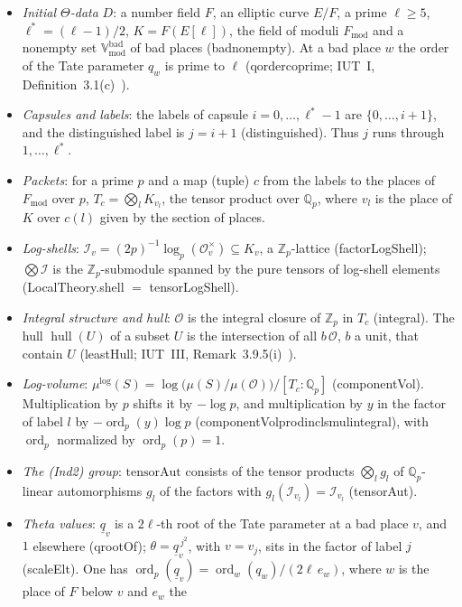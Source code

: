 \documentclass[11pt,a4paper]{article}
\newcommand{\Zp}{\mathbb{Z}_p}
\newcommand{\Qp}{\mathbb{Q}_p}
\newcommand{\I}{\mathcal{I}}
\newcommand{\Ocal}{\mathcal{O}}
\newcommand{\ordp}{\operatorname{ord}_p}
\newcommand{\hull}{\operatorname{hull}}
\newcommand{\mulog}{\mu^{\log}}
\newcommand{\Vbad}{\mathbb{V}_{\mathrm{mod}}^{\mathrm{bad}}}
\newcommand{\qb}{\underline{q}}
\newcommand{\leanus}{\textunderscore\allowbreak}
\newcommand{\lean}[1]{{\ttfamily\let\_\leanus #1}}
\theoremstyle{plain}
\theoremstyle{definition}
\theoremstyle{remark}
\begin{document}
\begin{itemize}
\item \emph{Initial $\Theta$-data} $D$: a number field $F$, an elliptic curve $E/F$, a prime $\ell\ge5$,
$\ell^*=(\ell-1)/2$, $K=F(E[\ell])$, the field of moduli $F_{\mathrm{mod}}$ and a nonempty set $\Vbad$ of bad places
(\lean{bad\_nonempty}). At a bad place $w$ the order of the Tate parameter $q_w$ is prime to $\ell$
(\lean{q\_order\_coprime}; IUT~I, Definition~3.1(c)~\cite{IUT1}).
\item \emph{Capsules and labels}: the labels of capsule $i=0,\dots,\ell^*-1$ are $\{0,\dots,i+1\}$, and the
distinguished label is $j=i+1$ (\lean{distinguished}). Thus $j$ runs through $1,\dots,\ell^*$.
\item \emph{Packets}: for a prime $p$ and a map (tuple) $c$ from the labels to the places of $F_{\mathrm{mod}}$ over $p$,
$T_c=\bigotimes_lK_{v_l}$, the tensor product over $\Qp$, where $v_l$ is the place of $K$ over $c(l)$ given by the
section of places.
\item \emph{Log-shells}: $\I_v=(2p)^{-1}\log_p(\Ocal_v^{\times})\subseteq K_v$, a $\Zp$-lattice
(\lean{factorLogShell}); $\bigotimes\I$ is the $\Zp$-submodule spanned by the pure tensors of log-shell elements
(\lean{LocalTheory.shell} $=$ \lean{tensorLogShell}).
\item \emph{Integral structure and hull}: $\Ocal$ is the integral closure of $\Zp$ in $T_c$ (\lean{integral}). The
hull $\hull(U)$ of a subset $U$ is the intersection of all $b\,\Ocal$, $b$ a unit, that contain $U$
(\lean{leastHull}; IUT~III, Remark~3.9.5(i)~\cite{IUT3}).
\item \emph{Log-volume}: $\mulog(S)=\log\bigl(\mu(S)/\mu(\Ocal)\bigr)/[T_c:\Qp]$ (\lean{componentVol}). Multiplication by
$p$ shifts it by $-\log p$, and multiplication by $y$ in the factor of label $l$ by $-\ordp(y)\log p$
(\lean{componentVol\_prod\_incl\_smul\_integral}), with $\ordp$ normalized by $\ordp(p)=1$.
\item \emph{The (Ind2) group}: $\mathrm{tensorAut}$ consists of the tensor products $\bigotimes_lg_l$ of
$\Qp$-linear automorphisms $g_l$ of the factors with $g_l(\I_{v_l})=\I_{v_l}$ (\lean{tensorAut}).
\item \emph{Theta values}: $\qb_v$ is a $2\ell$-th root of the Tate parameter at a bad place $v$, and $1$ elsewhere
(\lean{qrootOf}); $\theta=\qb_{v}^{\,j^2}$, with $v=v_j$, sits in the factor of label $j$ (\lean{scaleElt}). One has
$\ordp(\qb_v)=\operatorname{ord}_w(q_w)/(2\ell\,e_w)$, where $w$ is the place of $F$ below $v$ and $e_w$ the

\end{itemize}
\end{document}
